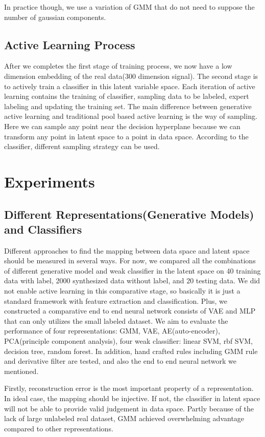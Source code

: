 \documentclass[letterpaper]{article}
\begin{document}
In practice though, we use a variation of GMM that do not need to suppose the number of gaussian components.


\subsection{Active Learning Process}
After we completes the first stage of training process, we now have a low dimension embedding of the real data(300 dimension signal). The second stage is to actively train a classifier in this latent variable space. Each iteration of active learning contains the training of classifier, sampling data to be labeled, expert labeling and updating the training set. The main difference between generative active learning and traditional pool based active learning is the way of sampling. Here we can sample any point near the decision hyperplane because we can transform any point in latent space to a point in data space. According to the classifier, different sampling strategy can be used.

\section{Experiments}
\subsection{Different Representations(Generative Models) and Classifiers}
Different approaches to find the mapping between data space and latent space should be measured in several ways. For now, we compared all the combinations of different generative model and weak classifier in the latent space on 40 training data with label, 2000 synthesized data without label, and 20 testing data. We did not enable active learning in this comparative stage, so basically it is just a standard framework with feature extraction and classification. Plus, we constructed a comparative end to end neural network consists of VAE and MLP that can only utilizes the small labeled dataset. We aim to evaluate the performance of four representations: GMM, VAE, AE(auto-encoder), PCA(principle component analysis), four weak classifier: linear SVM, rbf SVM, decision tree, random forest. In addition, hand crafted rules including GMM rule and derivative filter are tested, and also the end to end neural network we mentioned.

Firstly, reconstruction error is the most important property of a representation. In ideal case, the mapping should be injective. If not, the classifier in latent space will not be able to provide valid judgement in data space. Partly because of the lack of large unlabeled real dataset, GMM achieved overwhelming advantage compared to other representations.
\end{document}
